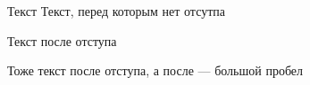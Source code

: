 \documentclass[a4paper, 12pt]{article}
\begin{document}
    Текст
    \vspace{10pt}
    Текст, перед которым нет отсутпа %

    Текст после отступа %
    \vspace{10pt}

    Тоже текст после отступа, \hspace{10pt} а после --- большой пробел
\end{document}
